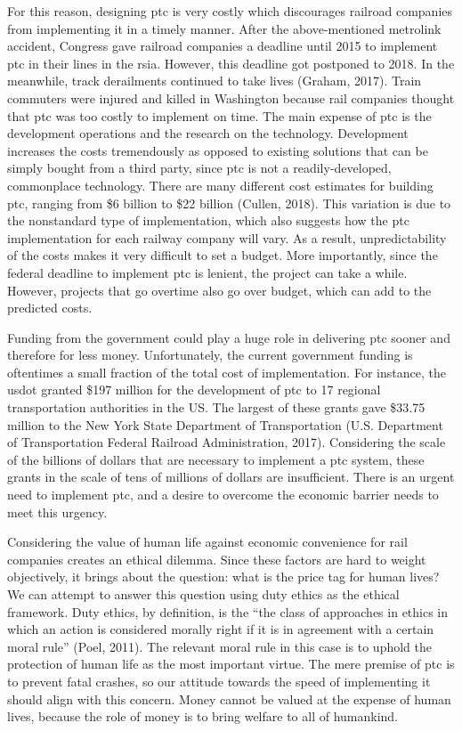\documentclass[11pt, titlepage]{article}
\begin{document}
For this reason, designing \gls{ptc} is very costly which discourages railroad
companies from implementing it in a timely manner. After the above-mentioned
\gls{metrolink} accident, Congress gave railroad companies a deadline until 2015 to
implement \gls{ptc} in their lines in the \gls{rsia}. However, this deadline got
postponed to 2018. In the meanwhile, track derailments continued to take lives
(Graham, 2017). Train commuters were injured and killed in Washington because rail
companies thought that \gls{ptc} was too costly to implement on time. The main
expense of \gls{ptc} is the development operations and the research on the
technology. Development increases the costs tremendously as opposed to existing
solutions that can be simply bought from a third party, since \gls{ptc} is not a
readily-developed, commonplace technology. There are many different cost estimates
for building \gls{ptc}, ranging from \$6 billion to \$22 billion (Cullen, 2018).
This variation is due to the nonstandard type of implementation, which also suggests
how the \gls{ptc} implementation for each railway company will vary. As a result,
unpredictability of the costs makes it very difficult to set a budget. More
importantly, since the federal deadline to implement \gls{ptc} is lenient, the
project can take a while. However, projects that go overtime also go over budget,
which can add to the predicted costs.

Funding from the government could play a huge role in delivering \gls{ptc} sooner
and therefore for less money. Unfortunately, the current government funding is
oftentimes a small fraction of the total cost of implementation. For instance, the
\gls{usdot} granted \$197 million for the development of \gls{ptc} to 17 regional
transportation authorities in the US. The largest of these grants gave \$33.75
million to the New York State Department of Transportation (U.S. Department of
Transportation Federal Railroad Administration, 2017). Considering the scale of the
billions of dollars that are necessary to implement a \gls{ptc} system, these grants
in the scale of tens of millions of dollars are insufficient. There is an urgent
need to implement \gls{ptc}, and a desire to overcome the economic barrier needs to
meet this urgency.

Considering the value of human life against economic convenience for rail companies
creates an ethical dilemma. Since these factors are hard to weight objectively, it
brings about the question: what is the price tag for human lives? We can attempt to
answer this question using duty ethics as the ethical framework. Duty ethics, by
definition, is the ``the class of approaches in ethics in which an action is
considered morally right if it is in agreement with a certain moral rule'' (Poel,
2011). The relevant moral rule in this case is to uphold the protection of human
life as the most important virtue. The mere premise of \gls{ptc} is to prevent fatal
crashes, so our attitude towards the speed of implementing it should align with this
concern. Money cannot be valued at the expense of human lives, because the role of
money is to bring welfare to all of humankind.
\end{document}
